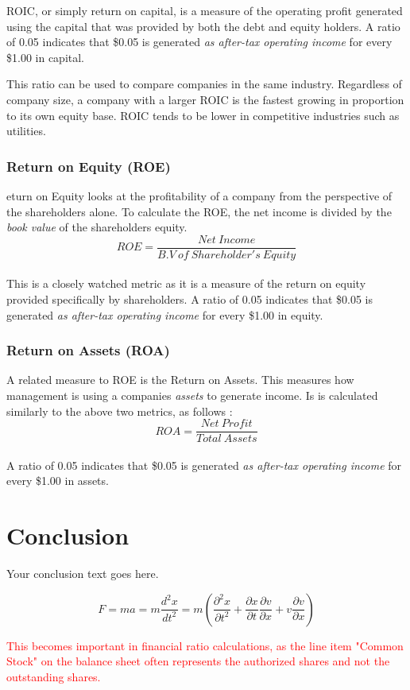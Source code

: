 \documentclass{article}
\begin{document}
ROIC, or simply return on capital, is a measure of the operating profit generated using the capital that was provided by both the debt and equity holders. A ratio of 0.05 indicates that \$0.05 is generated \textit{as after-tax operating income} for every \$1.00 in capital. 

This ratio can be used to compare companies in the same industry. Regardless of company size, a company with a larger ROIC is the fastest growing in proportion to its own equity base. ROIC tends to be lower in competitive industries such as utilities. 

\subsubsection{Return on Equity (ROE)}
eturn on Equity looks at the profitability of a company from the perspective of the shareholders alone. To calculate the ROE, the net income is divided by the \textit{book value} of the shareholders equity.
 \begin{equation}
    ROE = \frac{Net\: Income}{B.V\: of\: Shareholder's\: Equity}
\end{equation}\\
This is a closely watched metric as it is a measure of the return on equity provided specifically by shareholders. A ratio of 0.05 indicates that \$0.05 is generated \textit{as after-tax operating income} for every \$1.00 in equity. 

\subsubsection{Return on Assets (ROA)}
A related measure to ROE is the Return on Assets. This measures how management is using a companies \textit{assets} to generate income. Is is calculated similarly to the above two metrics, as follows :
 \begin{equation}
    ROA = \frac{Net\: Profit}{Total\: Assets}
\end{equation}\\

A ratio of 0.05 indicates that \$0.05 is generated \textit{as after-tax operating income} for every \$1.00 in assets.













\section{Conclusion}

Your conclusion text goes here.


\begin{equation}
    F = ma = m\frac{d^2x}{dt^2} = m\left(\frac{\partial^2x}{\partial t^2} + \frac{\partial x}{\partial t}\frac{\partial v}{\partial x} + v\frac{\partial v}{\partial x}\right)
\end{equation}

\textcolor{red}{This becomes important in financial ratio calculations, as the line item "Common Stock" on the balance sheet often represents the authorized shares and not the outstanding shares.}
\end{document}
